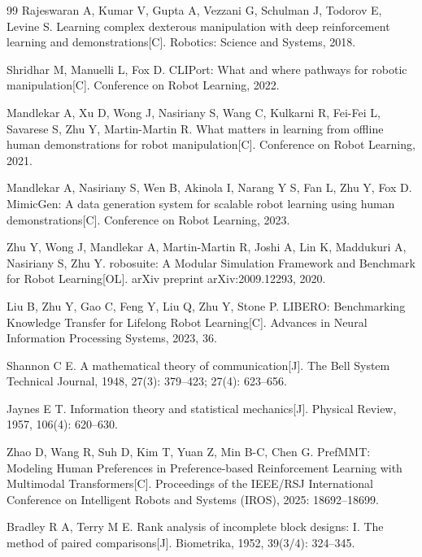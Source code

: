 \begin{thebibliography}{99}
    Rajeswaran A, Kumar V, Gupta A, Vezzani G, Schulman J, Todorov E, Levine S.
    Learning complex dexterous manipulation with deep reinforcement learning and demonstrations[C].
    Robotics: Science and Systems, 2018.
    
    Shridhar M, Manuelli L, Fox D.
    CLIPort: What and where pathways for robotic manipulation[C].
    Conference on Robot Learning, 2022.
    
    Mandlekar A, Xu D, Wong J, Nasiriany S, Wang C, Kulkarni R, Fei-Fei L, Savarese S, Zhu Y, Martin-Martin R.
    What matters in learning from offline human demonstrations for robot manipulation[C].
    Conference on Robot Learning, 2021.
    
    Mandlekar A, Nasiriany S, Wen B, Akinola I, Narang Y S, Fan L, Zhu Y, Fox D.
    MimicGen: A data generation system for scalable robot learning using human demonstrations[C].
    Conference on Robot Learning, 2023.
    
    Zhu Y, Wong J, Mandlekar A, Martin-Martin R, Joshi A, Lin K, Maddukuri A, Nasiriany S, Zhu Y.
    robosuite: A Modular Simulation Framework and Benchmark for Robot Learning[OL].
    arXiv preprint arXiv:2009.12293, 2020.
    
    Liu B, Zhu Y, Gao C, Feng Y, Liu Q, Zhu Y, Stone P.
    LIBERO: Benchmarking Knowledge Transfer for Lifelong Robot Learning[C].
    Advances in Neural Information Processing Systems, 2023, 36.

Shannon C E.
A mathematical theory of communication[J].
The Bell System Technical Journal, 1948, 27(3): 379--423; 27(4): 623--656.

Jaynes E T.
Information theory and statistical mechanics[J].
Physical Review, 1957, 106(4): 620--630.


Zhao D, Wang R, Suh D, Kim T, Yuan Z, Min B-C, Chen G.
PrefMMT: Modeling Human Preferences in Preference-based Reinforcement Learning with Multimodal Transformers[C].
Proceedings of the IEEE/RSJ International Conference on Intelligent Robots and Systems (IROS), 2025: 18692--18699.

Bradley R A, Terry M E.
Rank analysis of incomplete block designs: I. The method of paired comparisons[J].
Biometrika, 1952, 39(3/4): 324--345.



\end{thebibliography}
